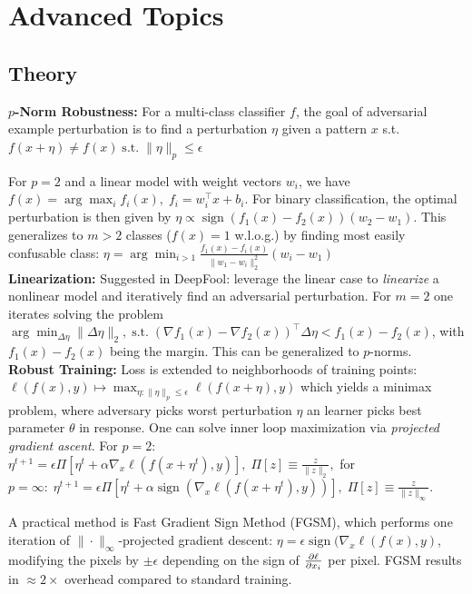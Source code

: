 \section{Advanced Topics}
\subsection{Theory}
\textbf{$p$-Norm Robustness:} For a multi-class classifier $f$, the goal of adversarial example perturbation is to find a perturbation $\eta$ given a pattern $x$ s.t. $f(x+\eta)\neq f(x) \; \text{s.t.} \; \|\eta\|_p \leq \epsilon$

For $p=2$ and a linear model with weight vectors $w_i$, we have $f(x)=\arg\max_if_i(x), \; f_i=w_i^\top x + b_i$. For binary classification, the optimal perturbation is then given by $\eta \propto \operatorname{sign}(f_1(x)-f_2(x))(w_2-w_1)$. This generalizes to  $m>2$ classes ($f(x)=1$ w.l.o.g.) by finding most easily confusable class: $\eta = \arg \min_{i>1}\frac{f_1(x)-f_i(x)}{\|w_1-w_i\|_2^2}(w_i-w_1)$\\

\textbf{Linearization:} Suggested in DeepFool: leverage the linear case to \emph{linearize} a nonlinear model and iteratively find an adversarial perturbation. For $m=2$ one iterates solving the problem $\arg\min_{\Delta \eta} \|\Delta \eta\|_2, \; \text{s.t.} \; (\nabla f_1(x) - \nabla f_2(x))^\top \Delta \eta < f_1(x)-f_2(x)$, with $f_1(x)-f_2(x)$ being the margin. This can be generalized to $p$-norms.\\
\textbf{Robust Training:} Loss is extended to neighborhoods of training points: $\ell(f(x), y)\mapsto \max_{\eta: \|\eta\|_p\leq \epsilon} \ell(f(x+\eta), y)$
which yields a minimax problem, where adversary picks worst perturbation $\eta$ an learner picks best parameter $\theta$ in response. One can solve inner loop maximization via \emph{projected gradient ascent}. For $p=2$: $\eta^{t+1}=\epsilon\Pi\left[\eta^t + \alpha\nabla_x\ell(f(x+\eta^t),y)\right],\;\Pi[z]\equiv\frac{z}{\|z\|_2},$ for $p=\infty: \; \eta^{t+1}=\epsilon\Pi\left[\eta^t + \alpha \operatorname{sign}(\nabla_x \ell(f(x+\eta^t), y))\right],\; \Pi[z]\equiv \frac{z}{\|z\|_{\infty}}$.

A practical method is Fast Gradient Sign Method (FGSM), which performs one iteration of $\|\cdot\|_\infty$-projected gradient descent: $\eta = \epsilon \operatorname{sign}(\nabla_x\ell(f(x),y)$, modifying the pixels by $\pm \epsilon$ depending on the sign of $\frac{\partial \ell}{\partial x_i}$ per pixel. FGSM results in $\approx 2\times$ overhead compared to standard training.


